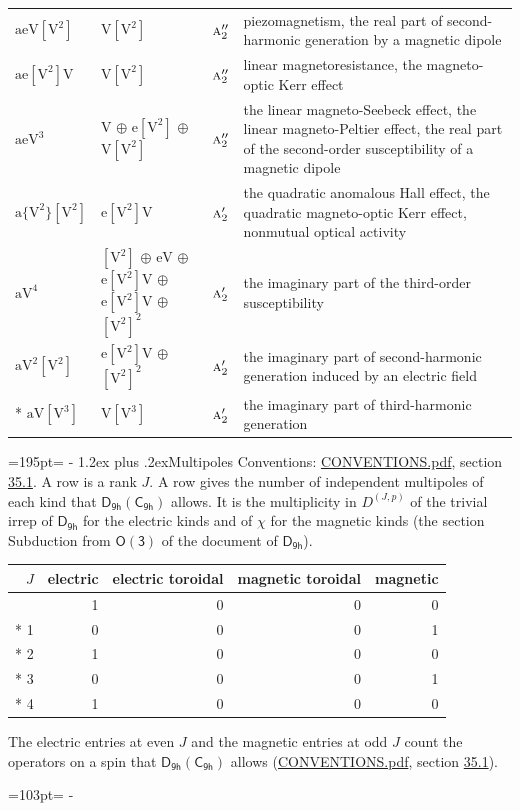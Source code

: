 \documentclass[10pt,a4paper]{article}
\makeatletter
\renewcommand\section{\@startsection{section}{1}{\z@}{-3ex plus -1ex minus -.2ex}%
  {1.2ex plus .2ex}{\normalfont\large\sffamily\bfseries\color{parttitle}}}
\newcommand{\needspace}[1]{\par\penalty-100\begingroup\dimen0=#1\relax\dimen2=\pagegoal
  \advance\dimen2-\pagetotal\ifdim\dimen0>\dimen2\relax\ifdim\dimen2>0pt\vfil\break\fi\fi
  \endgroup}
\numberwithin{equation}{section}
\newcommand{\grp}[1]{\mathsf{#1}}
\newcommand{\irr}[1]{\text{\normalfont\scshape #1}}
\newcommand{\irrJp}[2]{D^{(#1,#2)}}
\newcommand{\jahn}[1]{\mathrm{#1}}
\newlength{\fillwidth}\newlength{\cellwidth}\newlength{\colwidth}
\makeatother
\begin{document}
{\begin{longtable}{@{}lll>{\RaggedRight\arraybackslash}p{\fillwidth}@{}}
$\jahn{aeV[V^{2}]}$ & $\jahn{V[V^{2}]}$ & $\irr{a}_{2}''$ & piezomagnetism, the real part of second-harmonic generation by a magnetic dipole\\
$\jahn{ae[V^{2}]V}$ & $\jahn{V[V^{2}]}$ & $\irr{a}_{2}''$ & linear magnetoresistance, the magneto-optic Kerr effect\\
$\jahn{aeV^{3}}$ & $\jahn{V}$ $\oplus$ $\jahn{e[V^{2}]}$ $\oplus$ $\jahn{V[V^{2}]}$ & $\irr{a}_{2}''$ & the linear magneto-Seebeck effect, the linear magneto-Peltier effect, the real part of the second-order susceptibility of a magnetic dipole\\
$\jahn{a\{V^{2}\}[V^{2}]}$ & $\jahn{e[V^{2}]V}$ & $\irr{a}_{2}'$ & the quadratic anomalous Hall effect, the quadratic magneto-optic Kerr effect, nonmutual optical activity\\
$\jahn{aV^{4}}$ & $\jahn{[V^{2}]}$ $\oplus$ $\jahn{eV}$ $\oplus$ $\jahn{e[V^{2}]V}$ $\oplus$ $\jahn{e[V^{2}]V}$ $\oplus$ $\jahn{[V^{2}]^{2}}$ & $\irr{a}_{2}'$ & the imaginary part of the third-order susceptibility\\
$\jahn{aV^{2}[V^{2}]}$ & $\jahn{e[V^{2}]V}$ $\oplus$ $\jahn{[V^{2}]^{2}}$ & $\irr{a}_{2}'$ & the imaginary part of second-harmonic generation induced by an electric field\\*
$\jahn{aV[V^{3}]}$ & $\jahn{V[V^{3}]}$ & $\irr{a}_{2}'$ & the imaginary part of third-harmonic generation\\
\bottomrule\end{longtable}}
\needspace{195pt}
\section{Multipoles}\label{s:multipoles}
Conventions: \href{../../CONVENTIONS.pdf}{CONVENTIONS.pdf}, section \href{../../CONVENTIONS.pdf\#conv.35.1}{35.1}.
A row is a rank $J$. \label{n:head.multipole.electric}\label{n:head.multipole.electric.toroidal}\label{n:head.multipole.magnetic.toroidal}\label{n:head.multipole.magnetic}A row gives the number of independent multipoles of each kind that $\grp{D_{9h}}(\grp{C_{9h}})$ allows. It is the multiplicity in $\irrJp{J}{p}$ of the trivial irrep of $\grp{D_{9h}}$ for the electric kinds and of $\chi$ for the magnetic kinds (the section Subduction from $\grp{O(3)}$ of the document of \href{../../../rotation/data/pdf/D9h.pdf}{$\grp{D_{9h}}$}).
{\small\begin{longtable}{@{}rrrrr@{}}\toprule
$J$ & electric & electric toroidal & magnetic toroidal & magnetic\\\midrule\endhead
\bottomrule\endfoot\endlastfoot
0 & 1 & 0 & 0 & 0\\*
1 & 0 & 0 & 0 & 1\\*
2 & 1 & 0 & 0 & 0\\*
3 & 0 & 0 & 0 & 1\\*
4 & 1 & 0 & 0 & 0\\
\bottomrule\end{longtable}}
The electric entries at even $J$ and the magnetic entries at odd $J$ count the operators on a spin that $\grp{D_{9h}}(\grp{C_{9h}})$ allows (\href{../../CONVENTIONS.pdf}{CONVENTIONS.pdf}, section \href{../../CONVENTIONS.pdf\#conv.35.1}{35.1}).
\needspace{103pt}
\end{document}

